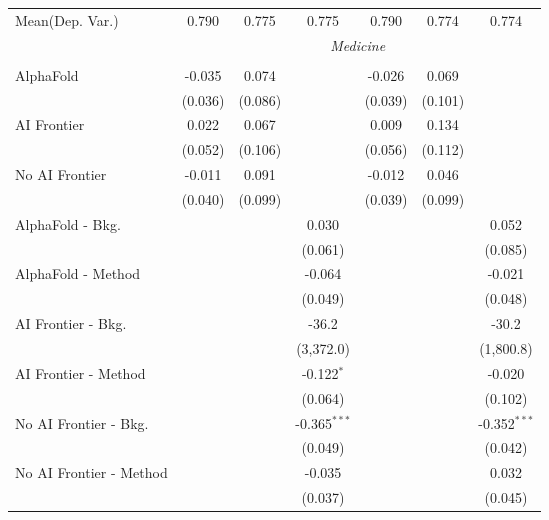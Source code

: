 \begin{tabular}{lcccccc}
Mean(Dep. Var.) & 0.790 & 0.775 & 0.775 & 0.790 & 0.774 & 0.774 \\
 & \multicolumn{6}{c}{\textit{Medicine}} \\ \\
   AlphaFold               & -0.035  & 0.074   &                & -0.026  & 0.069   &   \\   
                           & (0.036) & (0.086) &                & (0.039) & (0.101) &   \\   
   AI Frontier             & 0.022   & 0.067   &                & 0.009   & 0.134   &   \\   
                           & (0.052) & (0.106) &                & (0.056) & (0.112) &   \\   
   No AI Frontier          & -0.011  & 0.091   &                & -0.012  & 0.046   &   \\   
                           & (0.040) & (0.099) &                & (0.039) & (0.099) &   \\   
   AlphaFold - Bkg.        &         &         & 0.030          &         &         & 0.052\\   
                           &         &         & (0.061)        &         &         & (0.085)\\   
   AlphaFold - Method      &         &         & -0.064         &         &         & -0.021\\   
                           &         &         & (0.049)        &         &         & (0.048)\\   
   AI Frontier - Bkg.      &         &         & -36.2          &         &         & -30.2\\   
                           &         &         & (3,372.0)      &         &         & (1,800.8)\\   
   AI Frontier - Method    &         &         & -0.122$^{*}$   &         &         & -0.020\\   
                           &         &         & (0.064)        &         &         & (0.102)\\   
   No AI Frontier - Bkg.   &         &         & -0.365$^{***}$ &         &         & -0.352$^{***}$\\   
                           &         &         & (0.049)        &         &         & (0.042)\\   
   No AI Frontier - Method &         &         & -0.035         &         &         & 0.032\\   
                           &         &         & (0.037)        &         &         & (0.045)\\   

\end{tabular}
